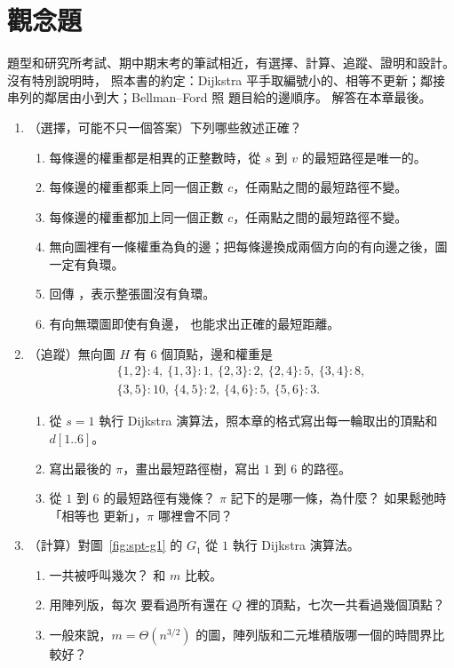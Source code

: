 \section{觀念題}
\label{sec:spt-exercises}

題型和研究所考試、期中期末考的筆試相近，有選擇、計算、追蹤、證明和設計。 沒有特別說明時，
照本書的約定：Dijkstra 平手取編號小的、相等不更新；鄰接串列的鄰居由小到大；Bellman--Ford 照
題目給的邊順序。 解答在本章最後。

\begin{enumerate}
\item \label{spt-q-tf}（選擇，可能不只一個答案）下列哪些敘述正確？
\begin{enumerate}
\item 每條邊的權重都是相異的正整數時，從 $s$ 到 $v$ 的最短路徑是唯一的。
\item 每條邊的權重都乘上同一個正數 $c$，任兩點之間的最短路徑不變。
\item 每條邊的權重都加上同一個正數 $c$，任兩點之間的最短路徑不變。
\item 無向圖裡有一條權重為負的邊；把每條邊換成兩個方向的有向邊之後，圖一定有負環。
\item {} 回傳 \TRUE，表示整張圖沒有負環。
\item 有向無環圖即使有負邊， 也能求出正確的最短距離。
\end{enumerate}

\item \label{spt-q-dij}（追蹤）無向圖 $H$ 有 $6$ 個頂點，邊和權重是
\begin{gather*}
\{1,2\}\!:4,\ \{1,3\}\!:1,\ \{2,3\}\!:2,\ \{2,4\}\!:5,\ \{3,4\}\!:8, \\
\{3,5\}\!:10,\ \{4,5\}\!:2,\ \{4,6\}\!:5,\ \{5,6\}\!:3.
\end{gather*}
\begin{enumerate}
\item 從 $s = 1$ 執行 Dijkstra 演算法，照本章的格式寫出每一輪取出的頂點和 $d[1..6]$。
\item 寫出最後的 $\pi$，畫出最短路徑樹，寫出 $1$ 到 $6$ 的路徑。
\item 從 $1$ 到 $6$ 的最短路徑有幾條？ $\pi$ 記下的是哪一條，為什麼？ 如果鬆弛時「相等也
更新」，$\pi$ 哪裡會不同？
\end{enumerate}

\item \label{spt-q-dk}（計算）對圖~\ref{fig:spt-g1} 的 $G_1$ 從 $1$ 執行 Dijkstra 演算法。
\begin{enumerate}
\item {} 一共被呼叫幾次？ 和 $m$ 比較。
\item 用陣列版，每次  要看過所有還在 $Q$ 裡的頂點，七次一共看過幾個頂點？
\item 一般來說，$m = \Theta(n^{3/2})$ 的圖，陣列版和二元堆積版哪一個的時間界比較好？
\end{enumerate}


\end{enumerate}
